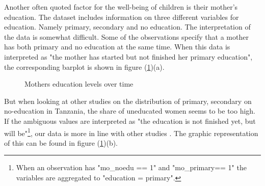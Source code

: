 \documentclass[a4paper, 11pt]{article} %
\begin{document}
\newpage
Another often quoted factor for the well-being of children is their mother's education. The dataset includes information on three different variables for education. Namely primary, secondary and no education. The interpretation of the data is somewhat difficult. Some of the observations specify that a mother has both primary and no education at the same time. When this data is interpreted as "the mother has started but not finished her primary education", the corresponding barplot is shown in figure (\ref{fig:education_proportion})(a). \\

\begin{figure}[h!]
    \centering
    \qquad
    \caption{Mothers education levels over time}%
    \label{fig:education_proportion}%
\end{figure}

But when looking at other studies on the distribution of primary, secondary on no-education in Tanzania, the share of uneducated women seems to be too high. If the ambiguous values are interpreted as "the education is not finished yet, but will be"\footnote{When an observation has "mo\_noedu == 1" and "mo\_primary== 1" the variables are aggregated to "education = primary".}, our data is more in line with other studies \cite{SAM08}. The graphic representation of this can be found in figure (\ref{fig:education_proportion})(b).  
\end{document}
